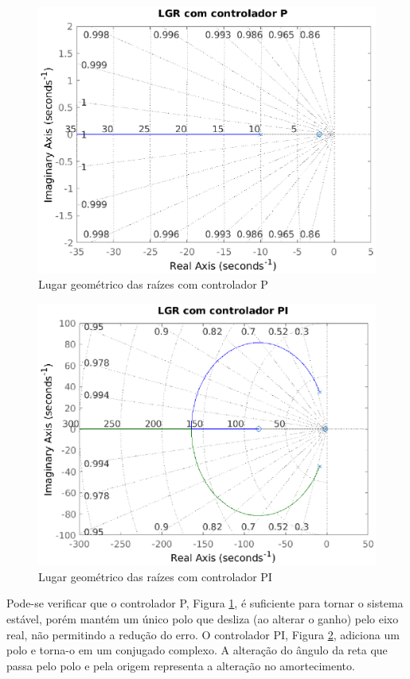     \begin{figure}[!ht]
        \centering
        \includegraphics[width = 0.75\linewidth]{Figuras/ProblemasPI/Problema4/lgrcomP.eps}
        \caption{Lugar geométrico das raízes com controlador P}
        \label{fig:LGR4BP}                   
    \end{figure}

    \begin{figure}[!ht]
        \centering
        \includegraphics[width = 0.75\linewidth]{Figuras/ProblemasPI/Problema4/lgrcomPI.eps}
        \caption{Lugar geométrico das raízes com controlador PI}
        \label{fig:LGR4BPI}                   
    \end{figure}

    Pode-se verificar que o controlador P, Figura \ref{fig:LGR4BP}, é suficiente para tornar o sistema estável, 
    porém mantém um único polo que desliza (ao alterar o ganho) pelo eixo real, não permitindo a redução do
    erro. O controlador PI, Figura \ref{fig:LGR4BPI}, adiciona um polo e torna-o em um conjugado complexo. A alteração 
    do ângulo da reta que passa pelo polo e pela origem representa a alteração no amortecimento.

